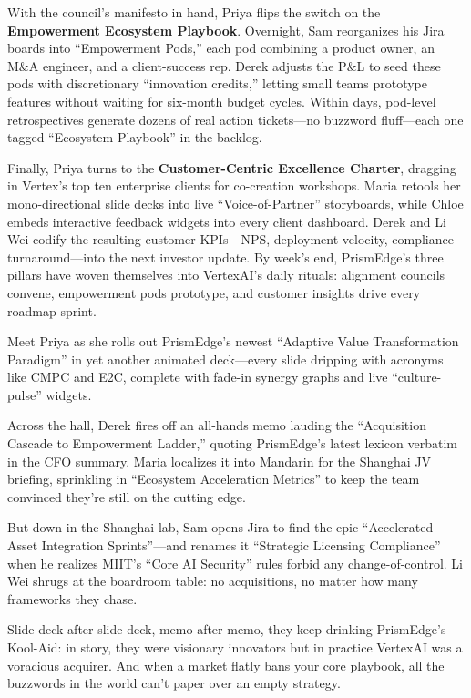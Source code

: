 With the council’s manifesto in hand, Priya flips the switch on the \textbf{Empowerment Ecosystem Playbook}. Overnight, 
Sam reorganizes his Jira boards into “Empowerment Pods,” each pod combining a product owner, an M\&A engineer, and 
a client-success rep. Derek adjusts the P\&L to seed these pods with discretionary “innovation credits,” letting 
small teams prototype features without waiting for six-month budget cycles. Within days, pod-level retrospectives 
generate dozens of real action tickets—no buzzword fluff—each one tagged “Ecosystem Playbook” in the backlog.

Finally, Priya turns to the \textbf{Customer-Centric Excellence Charter}, dragging in Vertex’s top ten enterprise clients 
for co-creation workshops. Maria retools her mono-directional slide decks into live “Voice-of-Partner” storyboards, 
while Chloe embeds interactive feedback widgets into every client dashboard. Derek and Li Wei codify the resulting 
customer KPIs—NPS, deployment velocity, compliance turnaround—into the next investor update. By week’s end, PrismEdge’s 
three pillars have woven themselves into VertexAI’s daily rituals: alignment councils convene, empowerment pods 
prototype, and customer insights drive every roadmap sprint.


Meet Priya as she rolls out PrismEdge’s newest “Adaptive Value Transformation Paradigm” in yet another animated 
deck—every slide dripping with acronyms like CMPC and E2C, complete with fade-in synergy graphs and live “culture-pulse”
 widgets.

Across the hall, Derek fires off an all-hands memo lauding the “Acquisition Cascade to Empowerment Ladder,” quoting 
PrismEdge’s latest lexicon verbatim in the CFO summary. Maria localizes it into Mandarin for the Shanghai JV briefing, 
sprinkling in “Ecosystem Acceleration Metrics” to keep the team convinced they’re still on the cutting edge.

But down in the Shanghai lab, Sam opens Jira to find the epic “Accelerated Asset Integration Sprints”—and renames it 
“Strategic Licensing Compliance” when he realizes MIIT’s “Core AI Security” rules forbid any change-of-control. Li Wei 
shrugs at the boardroom table: no acquisitions, no matter how many frameworks they chase.

Slide deck after slide deck, memo after memo, they keep drinking PrismEdge’s Kool-Aid: in story, they were visionary 
innovators but in practice VertexAI was a voracious acquirer. And when a market flatly bans your core playbook, all 
the buzzwords in the world can’t paper over an empty strategy.

